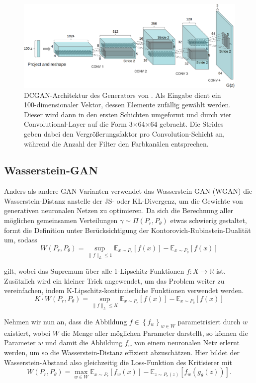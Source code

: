 \begin{figure}
\includegraphics[width=\textwidth]{images/dcgan-architecture}
\caption{DCGAN-Architektur des Generators von
\cite{radford2016unsupervised}. Als Eingabe dient ein 100-dimensionaler
Vektor, dessen Elemente zufällig gewählt werden. Dieser wird dann in den
ersten Schichten umgeformt und durch vier Convolutional-Layer auf die Form
3$\times$64$\times$64 gebracht. Die Strides geben dabei den
Vergrößerungsfaktor pro Convolution-Schicht an, während die Anzahl der
Filter den Farbkanälen entsprechen.}
\end{figure}

\subsection{Wasserstein-GAN}
Anders als andere GAN-Varianten verwendet das Wasserstein-GAN (WGAN) die
Was\-ser\-stein-Distanz anstelle der JS- oder KL-Divergenz, um die Gewichte
von generativen neuronalen Netzen zu optimieren. Da sich die Berechnung aller
möglichen gemeinsamen Verteilungen $\gamma \sim \Pi(P_r, P_\theta)$ etwas schwierig
gestaltet, formt \cite{arjovsky2017wasserstein} die Definition unter
Berücksichtigung der Kontorovich-Rubinstein-Dualität um, sodass
\[
W(P_r, P_\theta) = \sup_{\|f\|_L \leq 1} \mathbb{E}_{x \sim P_r}\left[f(x)\right] - \mathbb{E}_{x \sim P_\theta}\left[f(x)\right]
\]

gilt, wobei das Supremum über alle 1-Lipschitz-Funktionen $f : X \to
\mathbb{R}$ ist. Zusätzlich wird ein kleiner Trick angewendet, um das Problem
weiter zu vereinfachen, indem K-Lipschitz-kontinuierliche Funktionen verwendet
werden.
\[
K \cdot W(P_r, P_\theta) = \sup_{\|f\|_L \leq K} \mathbb{E}_{x \sim P_r}\left[f(x)\right] - \mathbb{E}_{x \sim P_\theta}\left[f(x)\right]
\]

Nehmen wir nun an, dass die Abbildung $f \in \left\{f_w\right\}_{w \in W}$
parametrisiert durch $w$ existiert, wobei $W$ die Menge aller möglichen
Parameter darstellt, so können die Parameter $w$ und damit die Abbildung $f_w$
von einem neuronalen Netz erlernt werden, um so die Wasserstein-Distanz
effizient abzuschätzen. Hier bildet der Wasserstein-Abstand also gleichzeitig
die Loss-Funktion des Kritisierer mit
\[
W(P_r, P_\theta) = \max_{w \in W} \mathbb{E}_{x \sim P_r}\left[f_w(x)\right]
- \mathbb{E}_{z \sim P_r(z)}\left[f_w(g_\theta(z))\right].
\]

